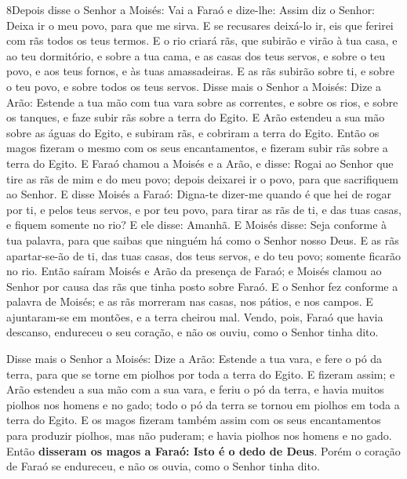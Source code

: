 \lettrine{8} Depois disse o Senhor a Moisés: Vai a Faraó e
dize-lhe: Assim diz o Senhor: Deixa ir o meu povo, para que me
sirva. E se recusares deixá-lo ir, eis que ferirei com rãs todos
os teus termos. E o rio criará rãs, que subirão e virão à tua
casa, e ao teu dormitório, e sobre a tua cama, e as casas dos teus
servos, e sobre o teu povo, e aos teus fornos, e às tuas
amassadeiras. E as rãs subirão sobre ti, e sobre o teu povo, e
sobre todos os teus servos. Disse mais o Senhor a Moisés: Dize a
Arão: Estende a tua mão com tua vara sobre as correntes, e sobre os
rios, e sobre os tanques, e faze subir rãs sobre a terra do Egito.
E Arão estendeu a sua mão sobre as águas do Egito, e subiram
rãs, e cobriram a terra do Egito. Então os magos fizeram o mesmo
com os seus encantamentos, e fizeram subir rãs sobre a terra do
Egito. E Faraó chamou a Moisés e a Arão, e disse: Rogai ao
Senhor que tire as rãs de mim e do meu povo; depois deixarei ir o
povo, para que sacrifiquem ao Senhor. E disse Moisés a Faraó:
Digna-te dizer-me quando é que hei de rogar por ti, e pelos teus
servos, e por teu povo, para tirar as rãs de ti, e das tuas casas, e
fiquem somente no rio? E ele disse: Amanhã. E Moisés disse:
Seja conforme à tua palavra, para que saibas que ninguém há como o
Senhor nosso Deus. E as rãs apartar-se-ão de ti, das tuas
casas, dos teus servos, e do teu povo; somente ficarão no rio.
Então saíram Moisés e Arão da presença de Faraó; e Moisés
clamou ao Senhor por causa das rãs que tinha posto sobre Faraó.
E o Senhor fez conforme a palavra de Moisés; e as rãs
morreram nas casas, nos pátios, e nos campos. E ajuntaram-se
em montões, e a terra cheirou mal. Vendo, pois, Faraó que
havia descanso, endureceu o seu coração, e não os ouviu, como o
Senhor tinha dito.

Disse mais o Senhor a Moisés: Dize a Arão: Estende a tua vara, e
fere o pó da terra, para que se torne em piolhos por toda a terra do
Egito. E fizeram assim; e Arão estendeu a sua mão com a sua
vara, e feriu o pó da terra, e havia muitos piolhos nos homens e no
gado; todo o pó da terra se tornou em piolhos em toda a terra do
Egito. E os magos fizeram também assim com os seus
encantamentos para produzir piolhos, mas não puderam; e havia
piolhos nos homens e no gado. Então \textbf{disseram os magos
a Faraó: Isto é o dedo de Deus}. Porém o coração de Faraó se
endureceu, e não os ouvia, como o Senhor tinha dito.

